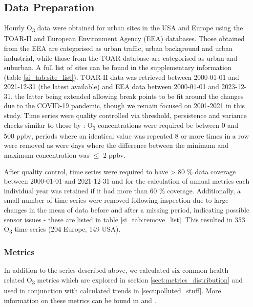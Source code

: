 \documentclass[journal abbreviation, manuscript]{copernicus}
\begin{document}
\subsection{Data Preparation} \label{sect:data_prep}
Hourly O\textsubscript{3} data were obtained for urban sites in the USA and Europe using the TOAR-II \citep{toar_db} and European Environment Agency (EEA) \citep{eea_1, eea_2} databases. Those obtained from the EEA are categorised as urban traffic, urban background and urban industrial, while those from the TOAR database are categorised as urban and suburban. A full list of sites can be found in the supplementary information (table \ref{si_tab:site_list}).  TOAR-II data was retrieved between 2000-01-01 and 2021-12-31 (the latest available) and EEA data between 2000-01-01 and 2023-12-31, the latter being extended allowing break points to be fit around the changes due to the COVID-19 pandemic, though we remain focused on 2001-2021 in this study. Time series were quality controlled via threshold, persistence and variance checks similar to those by \cite{Wang2023}: O\textsubscript{3} concentrations were required be between 0 and 500 ppbv, periods where an identical value was repeated 8 or more times in a row were removed as were days where the difference between the minimum and maximum concentration was $\leq$ 2 ppbv. 

After quality control, time series were required to have > 80 \% data coverage between 2000-01-01 and 2021-12-31 and for the calculation of annual metrics each individual year was retained if it had more than 60 \% coverage. Additionally, a small number of time series were removed following inspection due to large changes in the mean of data before and after a missing period, indicating possible sensor issues - these are listed in table \ref{si_tab:remove_list}. This resulted in 353 O\textsubscript{3} time series (204 Europe, 149 USA). 

\subsubsection{Metrics}

In addition to the series described above, we calculated six common health related O\textsubscript{3} metrics which are explored in section \ref{sect:metrics_distribution} and used in conjunction with calculated trends in \ref{sect:polluted_stuff}. More information on these metrics can be found in \cite{10.1525/elementa.279} and \cite{fleming_2018}.
\end{document}
